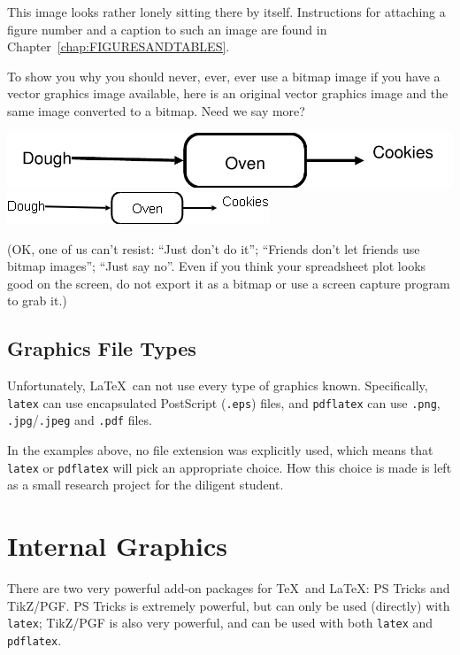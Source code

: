 This image looks rather lonely sitting there by itself.  Instructions
for attaching a figure number and a caption to such an image are found
in Chapter~\ref{chap:FIGURESANDTABLES}.

To show you why you should never, ever, ever use a bitmap image if you
have a vector graphics image available, here is an original vector
graphics image and the same image converted to a bitmap.  Need we say more?

\begin{center}
    \includegraphics[width=.4\textwidth]{figures/oven}
    \quad
    \includegraphics[width=.4\textwidth]{figures/oven-bitmap}  
\end{center}
%
(OK, one of us can't resist: ``Just don't do it''; ``Friends don't let
friends use bitmap images''; ``Just say no''.  Even if you think your
spreadsheet plot looks good on the screen, do not export it as a
bitmap or use a screen capture program to grab it.)

\subsection {Graphics File Types}

Unfortunately, \LaTeX\ can not use every type of graphics known.
Specifically, \verb|latex| can use encapsulated PostScript
(\verb|.eps|) files, and \verb|pdflatex| can use \verb|.png|,
\verb|.jpg|/\verb|.jpeg| and \verb|.pdf| files.

In the examples above, no file extension was explicitly used, which
means that \verb|latex| or \verb|pdflatex| will pick an appropriate
choice.  How this choice is made is left as a small research project
for the diligent student.

\section {Internal Graphics}

There are two very powerful add-on packages for \TeX\ and \LaTeX: PS
Tricks and TikZ/PGF.  PS Tricks is extremely powerful, but can only be
used (directly) with \verb|latex|; TikZ/PGF is also very powerful, and
can be used with both \verb|latex| and \verb|pdflatex|.

